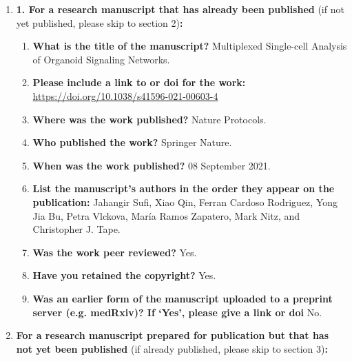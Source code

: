     \begin{enumerate}\itemsep0em
    
        \item \textbf{1.	For a research manuscript that has already been published} (if not yet published, please skip to section 2)\textbf{:}
        \begin{enumerate}\itemsep0em
            \item \textbf{What is the title of the manuscript?}
            Multiplexed Single-cell Analysis of Organoid Signaling Networks.
            \item \textbf{Please include a link to or doi for the work:}
            \url{https://doi.org/10.1038/s41596-021-00603-4}
            \item \textbf{Where was the work published?}
            Nature Protocols.
            \item \textbf{Who published the work?}
            Springer Nature.
            \item \textbf{When was the work published?}
            08 September 2021.
            \item \textbf{List the manuscript's authors in the order they appear on the publication:}
            Jahangir Sufi, Xiao Qin, Ferran Cardoso Rodriguez, Yong Jia Bu, Petra Vlckova, María Ramos Zapatero, Mark Nitz, and Christopher J. Tape.   
            \item \textbf{Was the work peer reviewed?}
            Yes.
            \item \textbf{Have you retained the copyright?}
            Yes.
            \item \textbf{Was an earlier form of the manuscript uploaded to a preprint server (e.g. medRxiv)? If ‘Yes’, please give a link or doi} 
            No.
        \end{enumerate}
        \item \textbf{For a research manuscript prepared for publication but that has not yet been published} (if already published, please skip to section 3)\textbf{:}

\end{enumerate}
